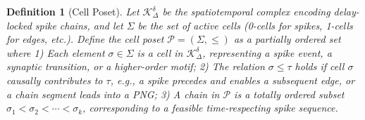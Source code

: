\documentclass[lettersize,journal]{IEEEtran}
\newtheorem{definition}{Definition}
\begin{document}
\begin{definition}[Cell Poset]
Let \( \mathcal{K}_\Delta^\delta \) be the spatiotemporal complex encoding delay-locked spike chains, and let \( \Sigma \) be the set of active cells (0-cells for spikes, 1-cells for edges, etc.). Define the cell poset \( \mathcal{P} = (\Sigma, \leq) \) as a partially ordered set where
1) Each element \( \sigma \in \Sigma \) is a cell in \( \mathcal{K}_\Delta^\delta \), representing a spike event, a synaptic transition, or a higher-order motif;
2) The relation \( \sigma \leq \tau \) holds if cell \( \sigma \) causally contributes to \( \tau \), e.g., a spike precedes and enables a subsequent edge, or a chain segment leads into a PNG;
3) A \emph{chain} in \( \mathcal{P} \) is a totally ordered subset \( \sigma_1 < \sigma_2 < \cdots < \sigma_k \), corresponding to a feasible time-respecting spike sequence.
\end{definition}
\end{document}
